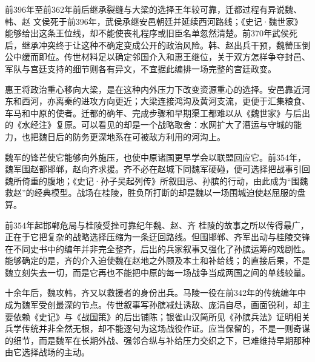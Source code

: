 \begin{event}{前396年至前362年前后}{继承裂缝与大梁的选择}{王年较可靠，迁都过程有异说}{魏、韩、赵}
文侯死于前396年，武侯承继安邑朝廷并延续西河路线；《史记·魏世家》能够给出这条王位线，却不能使丧礼程序或旧臣名单忽然清楚。前370年武侯死后，继承冲突终于让这种不确定变成公开的政治风险。韩、赵出兵干预，魏罃压倒公中缓而即位。传世材料足以确定邻国介入和惠王继位，关于双方怎样争夺封邑、军队与宫廷支持的细节则各有异文，不宜据此编排一场完整的宫廷政变。

惠王将政治重心移向大梁，是在这种内外压力下改变资源重心的选择。安邑靠近河东和西河，亦离秦的进攻方向更近；大梁连接鸿沟及黄河支流，更便于汇集粮食、车马和中原的使者。迁都的确年、完成步骤和早期渠工都难以从《魏世家》与后出的《水经注》复原。可以看见的却是一个战略取舍：水网扩大了漕运与守城的能力，也把魏日后的防务更深地系在可被敌方利用的河沟上。
\end{event}

魏军的锋芒使它能够向外施压，也使中原诸国更早学会以联盟回应它。前354年，魏军围赵都邯郸，赵向齐求援。齐不必在赵城下同魏军硬碰，便可选择把战事引回魏所倚重的腹地；《史记·孙子吴起列传》所叙田忌、孙膑的行动，由此成为“围魏救赵”的经典模型。战场在桂陵，胜负所打断的却是魏以一场围城迫使赵屈服的盘算。

\begin{event}{前354年起}{邯郸危局与桂陵受挫}{可靠纪年}{魏、赵、齐}
桂陵的故事之所以传得最广，正在于它把复杂的战略选择压缩为一条迂回路线。但围邯郸、齐军出动与桂陵交锋在不同史书中的编年并非完全整齐，后出的兵家叙事又强化了孙膑运筹的戏剧性。能够确定的是，齐的介入迫使魏在赵地之外顾及本土和补给线；的直接后果，不是魏立刻失去一切，而是它再也不能把中原的每一场战争当成两国之间的单线较量。
\end{event}

十余年后，魏攻韩，齐又以救援者的身份出兵。马陵一役在前342年的传统编年中成为魏军受创最深的节点。传世叙事写孙膑减灶诱敌、庞涓自尽，画面锐利，却主要依赖《史记》与《战国策》的后出铺陈；银雀山汉简所见《孙膑兵法》证明相关兵学传统并非全然无根，却不能逐句为这场战役作证。应当保留的，不是一则奇谋的细节，而是魏军在长期外战、强邻合纵与补给压力交织之下，已难维持早期那种由它选择战场的主动。

